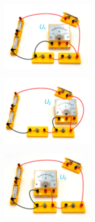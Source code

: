 \begin{figure}[h!]
\centering
    \begin{subfigure}[b]{0.305\textwidth}
    \centering
    \includegraphics[width=4.6cm]{_images/volt_serie_1.pdf}
    \end{subfigure}
\quad
    \begin{subfigure}[b]{0.305\textwidth}
    \centering
    \includegraphics[width=4.6cm]{_images/volt_serie_2.pdf}
    \end{subfigure}
\quad
    \begin{subfigure}[b]{0.305\textwidth}
    \centering
    \includegraphics[width=4.6cm]{_images/volt_serie_3.pdf}
    \end{subfigure}
\end{figure}


